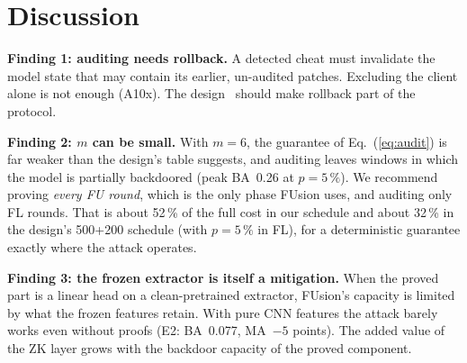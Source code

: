 \documentclass[conference]{IEEEtran}
\newcommand{\BA}{\textrm{BA}}
\newcommand{\MA}{\textrm{MA}}
\begin{document}
\begin{table}[t]
\centering\footnotesize\caption{Related approaches (after~\cite{zkdesign}).}\label{tab:related}
\setlength{\tabcolsep}{2.5pt}
\end{table}

\section{Discussion}\label{sec:discussion}
\textbf{Finding 1: auditing needs rollback.} A detected cheat must invalidate the model state that
may contain its earlier, un-audited patches. Excluding the client alone is not enough (A10x). The
design~\cite{zkdesign} should make rollback part of the protocol.

\textbf{Finding 2: $m$ can be small.} With $m=6$, the guarantee of Eq.~(\ref{eq:audit}) is far
weaker than the design's table suggests, and auditing leaves windows in which the model is
partially backdoored (peak \BA\ 0.26 at $p=5\,\%$). We recommend proving \emph{every FU round},
which is the only phase FUsion uses, and auditing only FL rounds. That is about 52\,\% of the full
cost in our schedule and about 32\,\% in the design's 500+200 schedule (with $p=5\,\%$ in FL), for
a deterministic guarantee exactly where the attack operates.

\textbf{Finding 3: the frozen extractor is itself a mitigation.} When the proved part is a linear
head on a clean-pretrained extractor, FUsion's capacity is limited by what the frozen features
retain. With pure CNN features the attack barely works even without proofs (E2: \BA\ 0.077, \MA\
$-5$ points). The added value of the ZK layer grows with the backdoor capacity of the proved
component.
\end{document}
